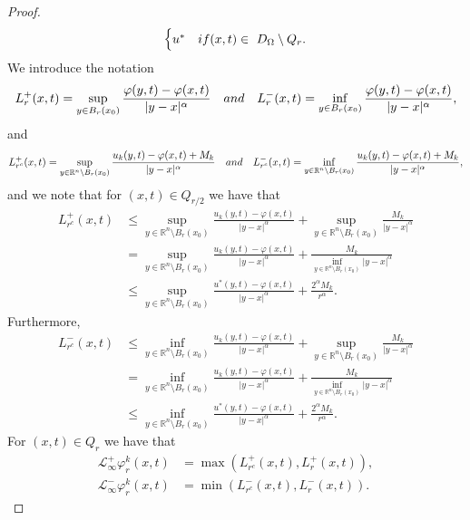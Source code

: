 \documentclass[10pt,a4paper]{amsart}
\providecommand{\Lneg}{\mathcal{L}_{\infty}^-}
\providecommand{\Lpos}{\mathcal{L}_{\infty}^+}
\providecommand{\Rn}{\mathbb{R}^n}
\providecommand{\Rnp}{D_{\Omega}}
\begin{document}
\begin{proof}
\begin{align*}
\begin{cases}
                      u^* & \textup{if  } (x,t) \in \ \Rnp \setminus Q_r.
            \end{cases}
 \end{align*}
We introduce the notation
    \begin{equation*}
        L^+_{r}(x,t) = \sup_{y \in B_r(x_0)} \frac{\varphi(y,t)-\varphi(x,t)}{|y-x|^{\alpha}} \quad \textup{and } \quad L^-_{r}(x,t) = \inf_{y \in B_r(x_0)} \frac{\varphi(y,t)-\varphi(x,t)}{|y-x|^{\alpha}},
    \end{equation*}
and
    \begin{equation*}
        L^+_{r^c}(x,t) = \sup_{y \in \Rn \setminus B_r(x_0)} \frac{u_k(y,t)-\varphi(x,t)+M_k}{|y-x|^{\alpha}} \quad \textup{and } \quad L^-_{r^c}(x,t) = \inf_{y \in \Rn \setminus B_r(x_0)} \frac{u_k(y,t)-\varphi(x,t) +M_k}{|y-x|^{\alpha}},
    \end{equation*}
    and we note that for $(x,t) \in Q_{r/2}$ we have that
\begin{align*}
     L^+_{r^c}(x,t) &\leq \sup_{y \in \Rn \setminus B_r(x_0)} \frac{u_k(y,t)-\varphi(x,t)}{|y-x|^{\alpha}} + \sup_{y \in \Rn \setminus B_r(x_0)} \frac{M_k}{|y-x|^{\alpha}} \\
     &= \sup_{y \in \Rn \setminus B_r(x_0)} \frac{u_k(y,t)-\varphi(x,t)}{|y-x|^{\alpha}} + \frac{M_k}{\inf_{y \in \Rn \setminus B_r(x_0)}|y-x|^{\alpha}} \\
     & \leq \sup_{y \in \Rn \setminus B_r(x_0)} \frac{u^*(y,t)-\varphi(x,t)}{|y-x|^{\alpha}} + \frac{2^{\alpha} M_k}{r^{\alpha}}.
\end{align*}
Furthermore,
\begin{align*}
    L^-_{r^c}(x,t) &\leq \inf_{y \in \Rn \setminus B_r(x_0)} \frac{u_k(y,t)-\varphi(x,t)}{|y-x|^{\alpha}} + \sup_{y \in \Rn \setminus B_r(x_0)} \frac{M_k}{|y-x|^{\alpha}} \\
     &= \inf_{y \in \Rn \setminus B_r(x_0)} \frac{u_k(y,t)-\varphi(x,t)}{|y-x|^{\alpha}} + \frac{M_k}{\inf_{y \in \Rn \setminus B_r(x_0)}|y-x|^{\alpha}} \\
     & \leq \inf_{y \in \Rn \setminus B_r(x_0)} \frac{u^*(y,t)-\varphi(x,t)}{|y-x|^{\alpha}} + \frac{2^{\alpha} M_k}{r^{\alpha}}.
\end{align*}
For $(x,t) \in Q_r$ we have that
    \begin{align*}
        \Lpos \varphi_{r}^k(x,t) &= \max(L^+_{r^c}(x,t), L^+_{r}(x,t)), \\
        \Lneg \varphi_{r}^k(x,t) &= \min(L^-_{r^c}(x,t), L^-_{r}(x,t)).
    \end{align*}

\end{proof}
\end{document}

